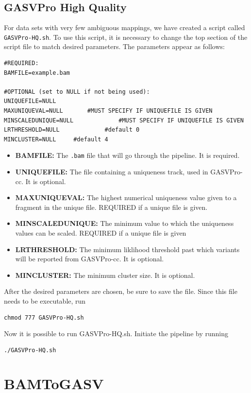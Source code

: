 \documentclass[11pt]{article}
\begin{document}
\subsection{GASVPro High Quality}
For data sets with very few ambiguous mappings, we have created a script called \verb+GASVPro-HQ.sh+. To use this script, it is necessary to change the top section of the script file to match desired parameters. The parameters appear as follows: 
\begin{Verbatim}[frame=single]
#REQUIRED:
BAMFILE=example.bam
                     
#OPTIONAL (set to NULL if not being used):
UNIQUEFILE=NULL
MAXUNIQUEVAL=NULL		#MUST SPECIFY IF UNIQUEFILE IS GIVEN
MINSCALEDUNIQUE=NULL             #MUST SPECIFY IF UNIQUEFILE IS GIVEN
LRTHRESHOLD=NULL	         #default 0
MINCLUSTER=NULL	  	#default 4
\end{Verbatim}
\begin{itemize}
\item {\bf BAMFILE:} The \verb+.bam+ file that will go through the pipeline. It is required.
\item {\bf UNIQUEFILE:} The file containing a uniqueness track, used in GASVPro-cc. It is optional.
\item {\bf MAXUNIQUEVAL:} The highest numerical uniqueness value given to a fragment in the unique file. REQUIRED if a unique file is given.
\item {\bf MINSCALEDUNIQUE:} The minimum value to which the uniqueness values can be scaled. REQUIRED if a unique file is given
\item {\bf LRTHRESHOLD:} The minimum liklihood threshold past which variants will be reported from GASVPro-cc. It is optional.
\item {\bf MINCLUSTER: } The minimum cluster size. It is optional.
\end{itemize}

\noindent After the desired parameters are chosen, be sure to save the file. Since this file needs to be executable, run 
\begin{Verbatim}[frame=single]
chmod 777 GASVPro-HQ.sh
\end{Verbatim}
Now it is possible to run GASVPro-HQ.sh. Initiate the pipeline by running 
\begin{Verbatim}[frame=single]
./GASVPro-HQ.sh
\end{Verbatim}


\section{BAMToGASV}
\end{document}
